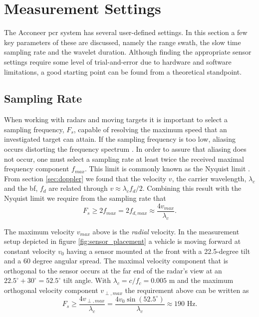 \section{Measurement Settings}

The Acconeer \gls{pcr} system has several user-defined settings. In this section a few key parameters of these are discussed, namely the range swath, the slow time sampling rate and the wavelet duration. Although finding the appropriate sensor settings require some level of trial-and-error due to hardware and software limitations, a good starting point can be found from a theoretical standpoint. 

\subsection{Sampling Rate}\label{sec:srate}
When working with radars and moving targets it is important to select a sampling frequency, $F_s$, capable of resolving the maximum speed that an investigated target can attain. If the sampling frequency is too low, aliasing occurs distorting the frequency spectrum \citep{lindgren_rootzezn_sandsten_2014}. In order to assure that aliasing does not occur, one must select a sampling rate at least twice the received maximal frequency component $f_{max}$. This limit is commonly known as the Nyquist limit \citep{proakis_manolakis_1995}. From section \ref{sec:doppler} we found that the velocity $v$, the carrier wavelength, $\lambda_c$ and the \gls{bf}, $f_d$ are related through $v \approx \lambda_cf_d/2$. Combining this result with the Nyquist limit we require from the sampling rate that
\begin{equation}
	\label{eq:nyquist}
		F_{s} \geq 2f_{max} 
		= 2f_{d,max} 
		\approx \frac{4v_{max}}{\lambda_c}.
\end{equation}

The maximum velocity $v_{max}$ above is the \emph{radial} velocity. In the measurement setup depicted in figure \ref{fig:sensor_placement} a vehicle is moving forward at constant velocity $v_0$ having a sensor mounted at the front with a 22.5-degree tilt and a 60 degree angular spread. The maximal velocity component that is orthogonal to the sensor occurs at the far end of the radar's view at an $22.5^\circ + 30^\circ = 52.5^\circ$ tilt angle. With $\lambda_c=c/f_c=0.005$ m and the maximum orthogonal velocity component $v_{\perp, max}$ the requirement above can be written as
\begin{equation}
	F_s \geq 
	\frac{4v_{\perp, max}}{\lambda_c}
	= \frac{4v_0\sin(52.5^\circ)}{\lambda_c} 
	\approx 190 \text{ Hz}.
\end{equation}

